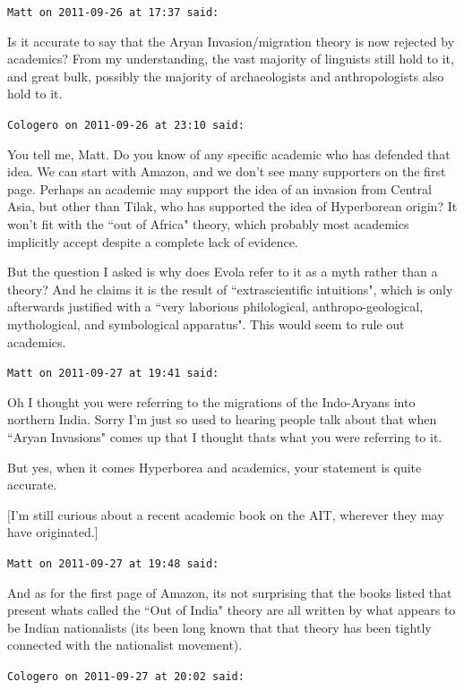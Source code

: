 \begin{footnotesize}
\begin{sffamily}
\hfill

\texttt{Matt on 2011-09-26 at 17:37 said: }

Is it accurate to say that the Aryan Invasion/migration theory is now rejected by academics? From my understanding, the vast majority of linguists still hold to it, and great bulk, possibly the majority of archaeologists and anthropologists also hold to it.


\hfill

\texttt{Cologero on 2011-09-26 at 23:10 said: }

You tell me, Matt. Do you know of any specific academic who has defended that idea. We can start with Amazon, and we don't see many supporters on the first page. Perhaps an academic may support the idea of an invasion from Central Asia, but other than Tilak, who has supported the idea of Hyperborean origin? It won't fit with the ``out of Africa" theory, which probably most academics implicitly accept despite a complete lack of evidence.

But the question I asked is why does Evola refer to it as a myth rather than a theory? And he claims it is the result of ``extrascientific intuitions", which is only afterwards justified with a ``very laborious philological, anthropo-geological, mythological, and symbological apparatus". This would seem to rule out academics.


\hfill

\texttt{Matt on 2011-09-27 at 19:41 said: }

Oh I thought you were referring to the migrations of the Indo-Aryans into northern India. Sorry I'm just so used to hearing people talk about that when ``Aryan Invasions" comes up that I thought thats what you were referring to it.

But yes, when it comes Hyperborea and academics, your statement is quite accurate.

[I'm still curious about a recent academic book on the AIT, wherever they may have originated.]


\hfill

\texttt{Matt on 2011-09-27 at 19:48 said: }

And as for the first page of Amazon, its not surprising that the books listed that present whats called the ``Out of India" theory are all written by what appears to be Indian nationalists (its been long known that that theory has been tightly connected with the nationalist movement).


\hfill

\texttt{Cologero on 2011-09-27 at 20:02 said: }


\end{sffamily}
\end{footnotesize}
